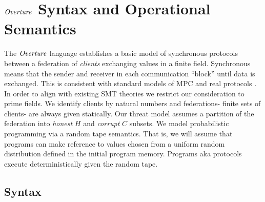 \section{$\mathit{Overture}$ Syntax and Operational Semantics}
\label{section-lang}

The $\mathit{Overture}$ language establishes a basic model of synchronous
protocols between a federation of \emph{clients} exchanging values in
a finite field. Synchronous means that the sender and receiver in each
communication ``block'' until data is exchanged. This is consistent
with standard models of MPC and real protocols \cite{evans2018pragmatic}.
In order to align with existing SMT theories
\cite{SMFF} we restrict our consideration to prime fields. We identify
clients by natural numbers and federations- finite sets of clients-
are always given statically.  Our threat model assumes a partition of
the federation into \emph{honest} $H$ and \emph{corrupt} $C$
subsets. We model probabilistic programming via a random tape
semantics. That is, we will assume that programs can make reference to
values chosen from a uniform random distribution defined in the
initial program memory.  Programs aka protocols execute
deterministically given the random tape.

\subsection{Syntax}

\minicatsyntaxfig

